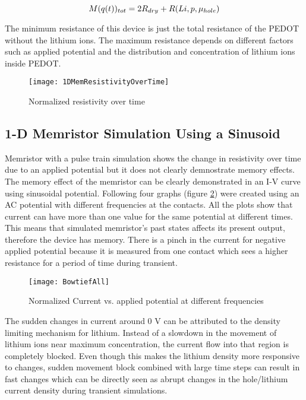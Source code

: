 \begin{doublespace}
\begin{equation}
\centering
M(q(t))_{tot}=2R_{dry}+R(Li,p,\mu_{hole})
\end{equation}

The minimum resistance of this device is just the total resistance of the PEDOT without the lithium ions. The maximum resistance depends on different factors such as applied potential and the distribution and concentration of lithium ions inside PEDOT.

\begin{figure}[!htp]
\centering
\texttt{[image: 1DMemResistivityOverTime]}
\caption{Normalized resistivity over time} 
\label{MemResistivityTrain}
\end{figure}

\clearpage
\subsection{1-D Memristor Simulation Using a Sinusoid}

Memristor with a pulse train simulation shows the change in resistivity over time due to an applied potential but it does not clearly demnostrate memory effects. The memory effect of the memristor can be clearly demonstrated in an I-V curve using sinusoidal potential. Following four graphs (figure \ref{Bowtie}) were created using an AC potential with different frequencies at the contacts. All the plots show that current can have more than one value for the same potential at different times. This means that simulated memristor's past states affects its present output, therefore the device has memory. There is a pinch in the current for negative applied potential because it is measured from one contact which sees a higher resistance for a period of time during transient. 

\begin{figure}[!htp]
\centering
\texttt{[image: BowtiefAll]}
\caption{Normalized Current vs. applied potential at different frequencies} 
\label{Bowtie}
\end{figure}


The sudden changes in current around 0 V can be attributed to the density limiting mechanism for lithium. Instead of a slowdown in the movement of lithium ions near maximum concentration, the current flow into that region is completely blocked. Even though this makes the lithium density more responsive to changes, sudden movement block combined with large time steps can result in fast changes which can be directly seen as abrupt changes in the hole/lithium current density during transient simulations.  


\end{doublespace}
